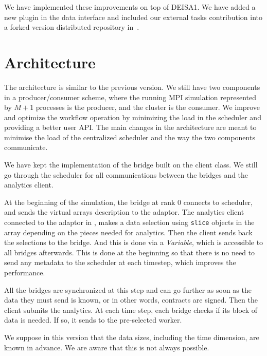 We have implemented these improvements on top of DEISA1\cite{deisa}. We have added a new \deisa plugin in the \pdi data interface and included our external tasks contribution into a forked version \dask distributed repository in~\cite{amal_distributed_2022}. 


\section{Architecture}

The architecture is similar to the previous \deisa version. We still have two components in a producer/consumer scheme, where the running MPI simulation represented by $M+1$ processes is the producer, and the \dask cluster is the consumer. We improve and optimize the workflow operation by minimizing the load in the scheduler and providing a better user API. The main changes in the architecture are meant to minimise the load of the centralized scheduler and the way the two components communicate.

We have kept the implementation of the bridge built on the \dask client class. We still go through the scheduler for all communications between the bridges and the analytics client.    

At the beginning of the simulation, the bridge at rank $0$ connects to \dask scheduler, and sends the \deisa virtual arrays description to the adaptor. The analytics client connected to the adaptor in \dask, makes a data selection using \texttt{slice} objects in the \deisa array depending on the pieces needed for analytics. Then the client sends back the selections to the bridge. And this is done via a \dask \textit{Variable}, which is accessible to all bridges afterwards. This is done at the beginning so that there is no need to send any metadata to the scheduler at each timestep, which improves the performance. 

All the bridges are synchronized at this step and can go further as soon as the data they must send is known, or in other words, contracts are signed. Then the client submits the analytics. 
At each time step, each bridge checks if its block of data is needed. If so, it sends to the pre-selected worker. 

We suppose in this version that the data sizes, including the time dimension, are known in advance. We are aware that this is not always possible. 

